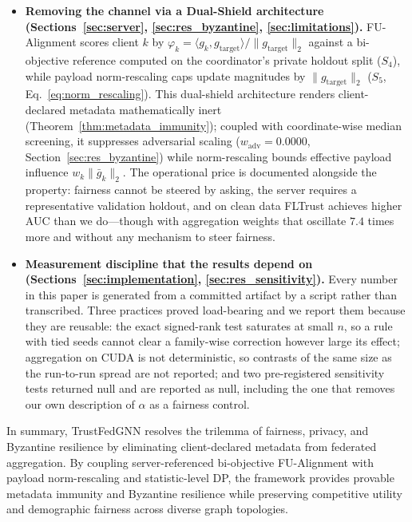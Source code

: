 \documentclass[preprint,12pt]{elsarticle}
\theoremstyle{plain}
\theoremstyle{definition}
\theoremstyle{remark}
\begin{document}
\begin{itemize}
\item \textbf{Removing the channel via a Dual-Shield architecture (Sections~\ref{sec:server}, \ref{sec:res_byzantine}, \ref{sec:limitations}).} FU-Alignment scores client $k$ by $\varphi_k = \langle g_k, g_{\mathrm{target}}\rangle / \lVert g_{\mathrm{target}}\rVert_2$ against a bi-objective reference computed on the coordinator's private holdout split ($S_4$), while payload norm-rescaling caps update magnitudes by $\lVert g_{\mathrm{target}}\rVert_2$ ($S_5$, Eq.~\ref{eq:norm_rescaling}). This dual-shield architecture renders client-declared metadata mathematically inert (Theorem~\ref{thm:metadata_immunity}); coupled with coordinate-wise median screening, it suppresses adversarial scaling ($w_{\mathrm{adv}} = 0.0000$, Section~\ref{sec:res_byzantine}) while norm-rescaling bounds effective payload influence $w_k \lVert\bar{g}_k\rVert_2$. The operational price is documented alongside the property: fairness cannot be steered by asking, the server requires a representative validation holdout, and on clean data FLTrust achieves higher AUC than we do---though with aggregation weights that oscillate $7.4$ times more and without any mechanism to steer fairness.

\item \textbf{Measurement discipline that the results depend on (Sections~\ref{sec:implementation}, \ref{sec:res_sensitivity}).} Every number in this paper is generated from a committed artifact by a script rather than transcribed. Three practices proved load-bearing and we report them because they are reusable: the exact signed-rank test saturates at small $n$, so a rule with tied seeds cannot clear a family-wise correction however large its effect; aggregation on CUDA is not deterministic, so contrasts of the same size as the run-to-run spread are not reported; and two pre-registered sensitivity tests returned null and are reported as null, including the one that removes our own description of $\alpha$ as a fairness control.
\end{itemize}

In summary, TrustFedGNN resolves the trilemma of fairness, privacy, and Byzantine resilience by eliminating client-declared metadata from federated aggregation. By coupling server-referenced bi-objective FU-Alignment with payload norm-rescaling and statistic-level DP, the framework provides provable metadata immunity and Byzantine resilience while preserving competitive utility and demographic fairness across diverse graph topologies.
\end{document}
